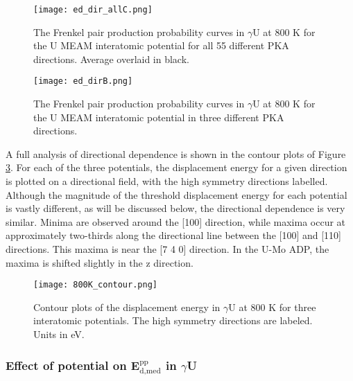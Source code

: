 \documentclass[review]{elsarticle}
\begin{document}
 \begin{figure}[h]
 \centering
 \texttt{[image: ed\_dir\_allC.png]} 
 \caption{The Frenkel pair production probability curves in $\gamma$U at 800 K for the U MEAM interatomic potential for all 55 different PKA directions. Average overlaid in black.}
 \label{fig:ed_dirall}
\end{figure}
 
\begin{figure}[h]
 \centering
 \texttt{[image: ed\_dirB.png]} 
 \caption{The Frenkel pair production probability curves in $\gamma$U at 800 K for the U MEAM interatomic potential in three different PKA directions.}
 \label{fig:ed_dir}
\end{figure}

\FloatBarrier

A full analysis of directional dependence is shown in the contour plots of Figure \ref{fig:800Kcontour}. For each of the three potentials, the displacement energy for a given direction is plotted on a directional field, with the high symmetry directions labelled. Although the magnitude of the threshold displacement energy for each potential is vastly different, as will be discussed below, the directional dependence is very similar. Minima are observed around the [100] direction, while maxima occur at approximately two-thirds along the directional line between the [100] and [110] directions. This maxima is near the [7 4 0] direction. In the U-Mo ADP, the maxima is shifted slightly in the z direction. 

\begin{figure}[h]
 \centering
 \texttt{[image: 800K\_contour.png]} 
 \caption{Contour plots of the displacement energy in $\gamma$U at 800 K for three interatomic potentials. The high symmetry directions are labeled. Units in eV.}
 \label{fig:800Kcontour}
\end{figure}

\FloatBarrier

\subsubsection{Effect of potential on E$^{\textrm{pp}}_{\textrm{d,med}}$ in $\gamma$U}
\end{document}
